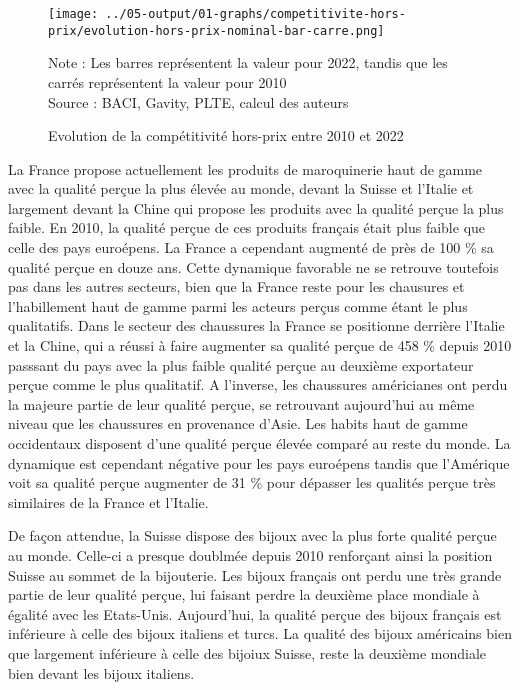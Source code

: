 \documentclass[french,10pt,a4paper]{article}
\begin{document}
\begin{figure}[!h]
  \centering
  \texttt{[image: ../05-output/01-graphs/competitivite-hors-prix/evolution-hors-prix-nominal-bar-carre.png]}
  \captionsetup{justification=justified, singlelinecheck=false, font=small}
  \caption*{Note : Les barres représentent la valeur pour 2022, tandis que les carrés représentent la valeur pour 2010 \\
  Source : BACI, Gavity, PLTE, calcul des auteurs}
  \captionsetup{justification=centering, singlelinecheck=true, font=normalsize}
  \caption{Evolution de la compétitivité hors-prix entre 2010 et 2022}
  \label{fig:hors-prix}
\end{figure}

\bigskip

La France propose actuellement les produits de maroquinerie haut de gamme avec la qualité perçue la plus élevée au monde, devant la Suisse et l'Italie et largement devant la Chine qui propose les produits avec la qualité perçue la plus faible. En 2010, la qualité perçue de ces produits français était plus faible que celle des pays euroépens. La France a cependant augmenté de près de 100 \% sa qualité perçue en douze ans. Cette dynamique favorable ne se retrouve toutefois pas dans les autres secteurs, bien que la France reste pour les chausures et l'habillement haut de gamme parmi les acteurs perçus comme étant le plus qualitatifs. Dans le secteur des chaussures la France se positionne derrière l'Italie et la Chine, qui a réussi à faire augmenter sa qualité perçue de 458 \% depuis 2010 passsant du pays avec la plus faible qualité perçue au deuxième exportateur perçue comme le plus qualitatif. A l'inverse, les chaussures américianes ont perdu la majeure partie de leur qualité perçue, se retrouvant aujourd'hui au même niveau que les chaussures en provenance d'Asie. Les habits haut de gamme occidentaux disposent d'une qualité perçue élevée comparé au reste du monde. La dynamique est cependant négative pour les pays euroépens tandis que l'Amérique voit sa qualité perçue augmenter de 31 \% pour dépasser les qualités perçue très similaires de la France et l'Italie.

De façon attendue, la Suisse dispose des bijoux avec la plus forte qualité perçue au monde. Celle-ci a presque doublmée depuis 2010 renforçant ainsi la position Suisse au sommet de la bijouterie. Les bijoux français ont perdu une très grande partie de leur qualité perçue, lui faisant perdre la deuxième place mondiale à égalité avec les Etats-Unis. Aujourd'hui, la qualité perçue des bijoux français est inférieure à celle des bijoux italiens et turcs. La qualité des bijoux américains bien que largement inférieure à celle des bijoiux Suisse, reste la deuxième mondiale bien devant les bijoux italiens.
\end{document}
